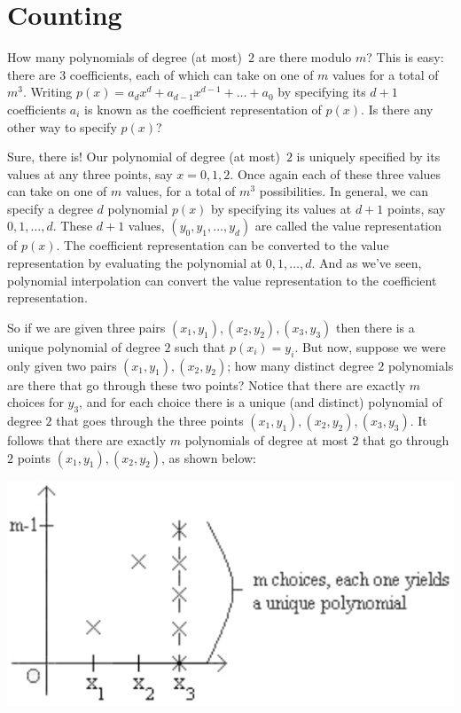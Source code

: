 \documentclass[11pt,fleqn]{article}
\begin{document}
\section*{Counting}

How many polynomials of degree (at most)~$2$ are there modulo $m$? 
This is easy: there are $3$ coefficients, each of which can take on one of $m$
values for a total of $m^3$. Writing $p(x) = a_d x^d + a_{d-1} x^{d-1} + \ldots + a_0$
by specifying its $d+1$ coefficients $a_i$ is known as the coefficient representation 
of $p(x)$. Is there any other way to specify $p(x)$? 

Sure, there is! Our polynomial of degree (at most)~$2$ is uniquely specified by 
its values at any three points, say $x = 0, 1, 2$. Once again each of these three
values can take on one of $m$ values, for a total of $m^3$ possibilities. 
In general, we can specify a degree $d$ polynomial $p(x)$ by specifying its
values at $d+1$ points, say $0, 1, \ldots , d$. These $d+1$ values, $(y_0,y_1, \dots,y_d)$
are called the value representation of $p(x)$. The coefficient representation
can be converted to the value representation by evaluating the polynomial
at $0, 1, \dots, d$. And as we've seen, polynomial interpolation can convert the value
representation to the coefficient representation.

So if we are given three pairs $(x_1, y_1), (x_2,y_2), (x_3, y_3)$ then  
there is a unique polynomial of degree $2$ such that $p(x_i) = y_i$.  
But now, suppose we were only given two pairs 
$(x_1, y_1), (x_2, y_2)$; how many distinct degree $2$ polynomials
are there that go through these two points? Notice
that there are exactly $m$ choices for $y_3$, and for each choice there 
is a unique (and distinct) polynomial
of degree $2$ that goes through the three points $(x_1, y_1), (x_2,y_2), (x_3, y_3)$. 
It follows that there are exactly $m$ polynomials of degree at most $2$ that go
through $2$ points $(x_1, y_1), (x_2, y_2)$, as shown below:

\includegraphics[bb = 0 0 125 147, scale = 0.7]{graph3}
\end{document}
